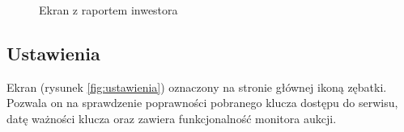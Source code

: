 \documentclass[a4paper,twoside,titlepage,openright]{book}
\begin{document}
\begin{figure}[!ht]
\begin{minipage}[t]{0.3\textwidth}
		\caption{Ekran z raportem inwestora}
		\label{fig:raportInwestora}
	\end{minipage}
\end{figure}

\subsection{Ustawienia}
Ekran (rysunek \ref{fig:ustawienia}) oznaczony na stronie głównej ikoną zębatki. Pozwala on na sprawdzenie poprawności pobranego klucza dostępu do serwisu, datę ważności klucza oraz zawiera funkcjonalność monitora aukcji. 
\end{document}
